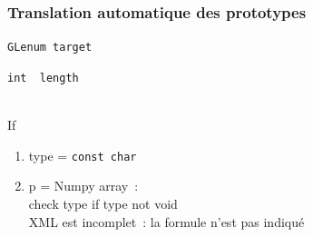 \begin{frame}
  \frametitle{Translation automatique des prototypes}
  \begin{description}
    \item[simple] \texttt{GLenum target} \\[1em]
    \item[output par référence] \texttt{int \alert{\ptr [1]} length} \\
       \\[1em]
    \item[Pointeur Complexe]
      If
      \begin{enumerate}
      \item type = \texttt{const char \ptr}
      \item p = Numpy array~: \\
        check type if type not void \\
      \attention{} \alert{XML est incomplet~: la formule n'est pas indiqué}
      \end{enumerate}
  \end{description}
  \note{
    \begin{enumerate}
    \item 
    \end{enumerate}
  }
\end{frame}

